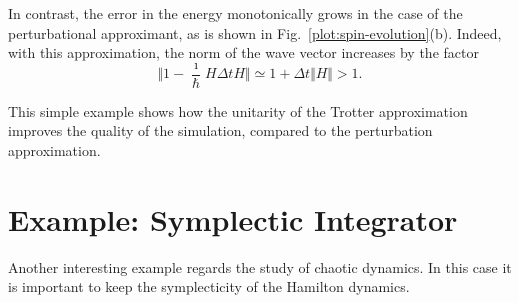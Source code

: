 In contrast, the error in the energy monotonically grows in the case of the perturbational approximant, as is shown in Fig.~\ref{plot:spin-evolution}(b). Indeed, with this approximation, the norm of the wave vector increases by the factor
\begin{equation}
\Vert 1 - \frac{\imath}{\hbar} H \Delta t H \Vert \simeq 1 + \Delta t \Vert H \Vert > 1.
\end{equation}

This simple example shows how the unitarity of the Trotter approximation improves the quality of the simulation, compared to the perturbation approximation.

\section{Example: Symplectic Integrator}
Another interesting example regards the study of chaotic dynamics. In this case it is important to keep the symplecticity of the Hamilton dynamics.

